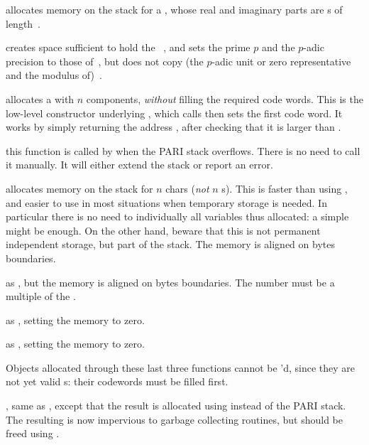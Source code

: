  allocates memory on the stack for a
, whose real and imaginary parts are s
of length~.

 creates space sufficient to hold the
~, and sets the prime $p$ and the $p$-adic precision to
those of~, but does not copy (the $p$-adic unit or zero representative
and the modulus of)~.

 allocates a  with $n$ components,
\emph{without} filling the required code words. This is the low-level
constructor underlying , which calls  then sets
the first code word. It works by simply returning the address
, after checking that it is larger than .

 this function is called by
 when the PARI stack overflows. There is no need to call it
manually. It will either extend the stack or report an  error.

 allocates memory on the stack for $n$
chars (\emph{not} $n$ s). This is faster than using ,
and easier to use in most situations when temporary storage is needed. In
particular there is no need to  individually all variables thus
allocated: a simple  might be enough. On the other hand,
beware that this is not permanent independent storage, but part of the stack.
The memory is aligned on  bytes boundaries.

 as ,
but the memory is aligned on  bytes boundaries. The number must
be a multiple of the .

 as , setting the memory
to zero.

 as
, setting the memory to zero.

\noindent Objects allocated through these last three functions cannot be
'd, since they are not yet valid s: their codewords
must be filled first.

, same as , except
that the result is allocated using  instead of the PARI
stack. The resulting  is now impervious to garbage collecting
routines, but should be freed using .

